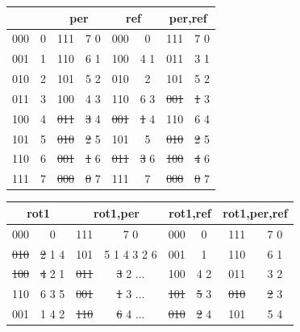 \documentclass{ijuc}
\begin{document}
\begin{table}
\begin{center}
\begin{tabular}{cc|cc|cc|cc}
\multicolumn{2}{c|}{} & \multicolumn{2}{c|}{per} & \multicolumn{2}{c|}{ref} & \multicolumn{2}{c}{per,ref} \\ \hline
000 & 0               &       111  &       7  0  &       000  &       0     &       111  &       7  0     \\
001 & 1               &       110  &       6  1  &       100  &       4  1  &       011  &       3  1     \\
010 & 2               &       101  &       5  2  &       010  &       2     &       101  &       5  2     \\
011 & 3               &       100  &       4  3  &       110  &       6  3  & \sout{001} & \sout{1} 3     \\
100 & 4               & \sout{011} & \sout{3} 4  & \sout{001} & \sout{1} 4  &       110  &       6  4     \\
101 & 5               & \sout{010} & \sout{2} 5  &       101  &       5     & \sout{010} & \sout{2} 5     \\
110 & 6               & \sout{001} & \sout{1} 6  & \sout{011} & \sout{3} 6  & \sout{100} & \sout{4} 6     \\
111 & 7               & \sout{000} & \sout{0} 7  &       111  &       7     & \sout{000} & \sout{0} 7     \\
\end{tabular}
\begin{tabular}{cc|cc|cc|cc}
\multicolumn{2}{c|}{rot1} & \multicolumn{2}{c|}{rot1,per} & \multicolumn{2}{c|}{rot1,ref} & \multicolumn{2}{c}{rot1,per,ref} \\ \hline
      000  &       0      &       111  &       7  0         &       000  &       0          &       111  &       7  0          \\
\sout{010} & \sout{2} 1 4 &       101  &       5  1 4 3 2 6 &       001  &       1          &       110  &       6  1          \\
\sout{100} & \sout{4} 2 1 & \sout{011} & \sout{3} 2 ...     &       100  &       4  2       &       011  &       3  2          \\
      110  &       6  3 5 & \sout{001} & \sout{1} 3 ...     & \sout{101} & \sout{5} 3       & \sout{010} & \sout{2} 3          \\
      001  &       1  4 2 & \sout{110} & \sout{6} 4 ...     & \sout{010} & \sout{2} 4       &       101  &       5  4          \\

\end{tabular}
\end{center}
\end{table}
\end{document}
